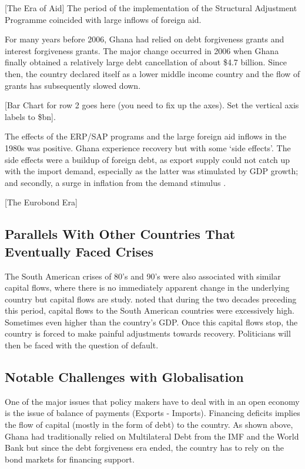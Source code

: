 \documentclass[a4paper, 12pt]{article}
\begin{document}
	[The Era of Aid]
	The period of the implementation of the Structural Adjustment Programme coincided with large inflows of foreign aid.  
	\cite{tsikata1999aid}
	\cite{Foreignaidd}
	\cite{Tradeopenness}
	\cite{Riddell09}
	
	For many years before 2006, Ghana had relied on debt forgiveness grants and interest forgiveness grants. The major change occurred in 2006 when Ghana finally obtained a relatively large debt cancellation of about \$4.7 billion. Since then, the country declared itself as a lower middle income country and the flow of grants has subsequently slowed down.
	
	[Bar Chart for row 2 goes here (you need to fix up the axes). Set the vertical axis labels to \$bn].
	
	The effects of the ERP/SAP programs and the large foreign aid inflows in the 1980s was positive. Ghana experience recovery but with some `side effects'. The side effects were a buildup of foreign debt, as export supply could not catch up with the import demand, especially as the latter was stimulated by GDP growth; and secondly, a surge in inflation from the demand stimulus \cite{StructuralAdj}.
	
	[The Eurobond Era]
	
	\subsection{Parallels With Other Countries That Eventually Faced Crises}
	The South American crises of 80's and 90's were also associated with similar capital flows, where there is no immediately apparent change in the underlying country but capital flows are study.  noted that during the two decades preceding this period, capital flows to the South American countries were excessively high. Sometimes even higher than the country's GDP. Once this capital flows stop, the country is forced to make painful adjustments towards recovery. Politicians will then be faced with the question of default. 


	\subsection{Notable Challenges with Globalisation}
	
	One of the major issues that policy makers have to deal with in an open economy is the issue of balance of payments (Exports - Imports). Financing deficits implies the flow of capital (mostly in the form of debt) to the country. As shown above, Ghana had traditionally relied on Multilateral Debt from the IMF and the World Bank but since the debt forgiveness era ended, the country has to rely on the bond markets for financing support.
	
\end{document}
